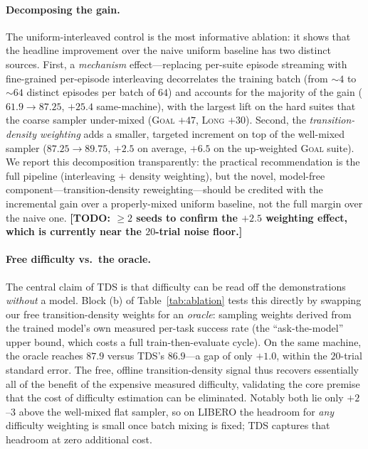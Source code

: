 \documentclass[letterpaper]{article} %
\newcommand{\tds}{TDS}
\begin{document}
\paragraph{Decomposing the gain.} The uniform-interleaved control is the most informative ablation: it shows that the headline improvement over the naive uniform baseline has two distinct sources. First, a \emph{mechanism} effect---replacing per-suite episode streaming with fine-grained per-episode interleaving decorrelates the training batch (from $\sim\!4$ to $\sim\!64$ distinct episodes per batch of $64$) and accounts for the majority of the gain ($61.9\!\rightarrow\!87.25$, $+25.4$ same-machine), with the largest lift on the hard suites that the coarse sampler under-mixed (\textsc{Goal} $+47$, \textsc{Long} $+30$). Second, the \emph{transition-density weighting} adds a smaller, targeted increment on top of the well-mixed sampler ($87.25\!\rightarrow\!89.75$, $+2.5$ on average, $+6.5$ on the up-weighted \textsc{Goal} suite). We report this decomposition transparently: the practical recommendation is the full pipeline (interleaving $+$ density weighting), but the novel, model-free component---transition-density reweighting---should be credited with the incremental gain over a properly-mixed uniform baseline, not the full margin over the naive one. \textbf{[TODO: $\ge 2$ seeds to confirm the $+2.5$ weighting effect, which is currently near the $20$-trial noise floor.]}

\paragraph{Free difficulty vs.\ the oracle.} The central claim of \tds{} is that difficulty can be read off the demonstrations \emph{without} a model. Block (b) of Table~\ref{tab:ablation} tests this directly by swapping our free transition-density weights for an \emph{oracle}: sampling weights derived from the trained model's own measured per-task success rate (the ``ask-the-model'' upper bound, which costs a full train-then-evaluate cycle). On the same machine, the oracle reaches $87.9$ versus \tds{}'s $86.9$---a gap of only $+1.0$, within the $20$-trial standard error. The free, offline transition-density signal thus recovers essentially all of the benefit of the expensive measured difficulty, validating the core premise that the cost of difficulty estimation can be eliminated. Notably both lie only $+2$--$3$ above the well-mixed flat sampler, so on LIBERO the headroom for \emph{any} difficulty weighting is small once batch mixing is fixed; \tds{} captures that headroom at zero additional cost.
\end{document}
